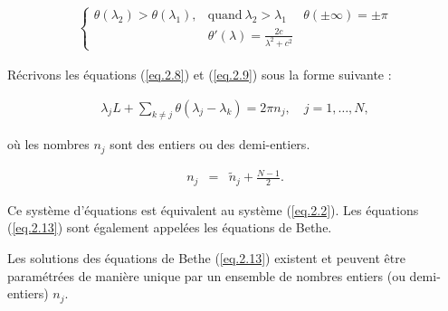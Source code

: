 \begin{eqnarray}
	\left \{ \begin{array}{ccc}  \theta(\lambda_2) > \theta(\lambda_1), &   \mbox{quand} ~ \lambda_2 > \lambda_1 & \theta(\pm \infty) = \pm \pi \\ & \displaystyle \theta'(\lambda) = \frac{2c}{\lambda^2 + c^2}\end{array} \right .		
\end{eqnarray}

Récrivons les équations (\ref{eq.2.8}) et (\ref{eq.2.9}) sous la forme suivante :

\begin{eqnarray}
	\lambda_j L + \sum_{k \neq j} \theta(\lambda_j - \lambda_k) = 2 \pi n_j, \quad j = 1, \dots, N,	\label{eq.2.13}	
\end{eqnarray}

où les nombres \( n_j \) sont des entiers ou des demi-entiers.

\begin{eqnarray}
	n_j & = & \tilde{n}_j + \frac{N-1}{2}.	
\end{eqnarray}


Ce système d'équations est équivalent au système (\ref{eq.2.2}). Les équations (\ref{eq.2.13}) sont également appelées les équations de Bethe.

\begin{TheoPrinc}
	Les solutions des équations de Bethe (\ref{eq.2.13}) existent et peuvent être paramétrées de manière unique par un ensemble de nombres entiers (ou demi-entiers) \( n_j \).	
\end{TheoPrinc}

